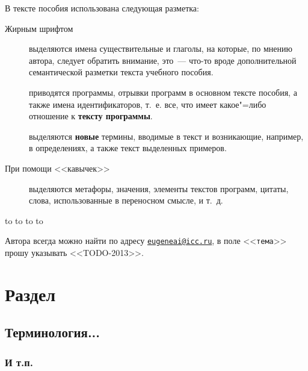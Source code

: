 \documentclass[12pt, openany, twoside, final]{extbook} %
\begin{document}
В тексте пособия использована следующая разметка:
\begin{description}
\item[Жирным шрифтом] выделяются имена существительные и глаголы, на которые, по мнению автора, следует обратить внимание, это~--- что-то вроде дополнительной семантической разметки текста учебного пособия.
\item[] приводятся программы, отрывки программ в основном тексте пособия, а также имена идентификаторов, т.~е. все, что имеет какое"=либо отношение к {\bf тексту программы}.
\item[] выделяются {\bf новые} термины, вводимые в текст и возникающие, например, в определениях, а также текст выделенных примеров.
\item[\normalfont При помощи <<кавычек>>] выделяются метафоры, значения, элементы текстов программ, цитаты, слова, использованные в переносном смысле, и т.~д.
\end{description}

\medskip
\noindent\hbox to \linewidth{\hfill\sf Старший~научный сотрудник ИДСТУ СО РАН,}
\noindent\hbox to \linewidth{\hfill\sf доцент кафедры ИТ ИМЭИ ИГУ}
\noindent\hbox to \linewidth{\hfill\sf кандидат~технических~наук}
\noindent\hbox to \linewidth{\hfill\sf Е.~А.~Черкашин}

\vfill
\makeatletter
{} Автора всегда можно найти по адресу \href{mailto:eugeneai@icc.ru}{\tt{}eugeneai@icc.ru}, в поле <<{\tt тема}>> прошу указывать <<TODO-2013>>.
\makeatother

\chapter{Раздел}


\section{Терминология...}


\subsection{И т.п.}
\end{document}
